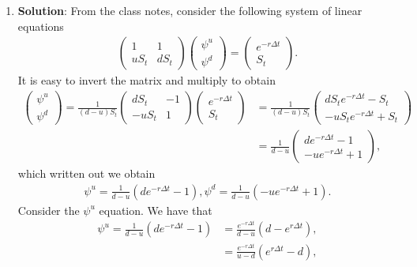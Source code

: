 \documentclass[10pt,english]{article}
\theoremstyle{plain}
\begin{document}
\begin{enumerate}
\item \textbf{Solution}: From the class notes, consider the following system of linear equations
\begin{align}
\left(
\begin{array}{cc}
1 & 1 \\
uS_{t} & dS_{t}
\end{array}\right)\left(\begin{array}{c}
\psi^{u}\\
\psi^{d}
\end{array}\right)=
\left(\begin{array}{c}
e^{-r\Delta t} \\
S_{t}
\end{array}\right).\label{leq}
\end{align}
It is easy to invert the matrix and multiply to obtain
\begin{align*}
\left(\begin{array}{c}
\psi^{u}\\
\psi^{d}
\end{array}\right)=\frac{1}{(d-u)S_{t}}\left(\begin{array}{cc}
dS_{t} & -1 \\
-uS_{t} & 1
\end{array}\right)
\left(\begin{array}{c}
e^{-r\Delta t} \\
S_{t}
\end{array}\right)&=\frac{1}{(d-u)S_{t}}\left(\begin{array}{c}
dS_{t}e^{-r\Delta t}-S_{t}\\
-uS_{t}e^{-r\Delta t} + S_{t}
\end{array}\right)\\
&=\frac{1}{d-u}\left(\begin{array}{c}
de^{-r\Delta t}-1\\
-ue^{-r\Delta t} +1
\end{array}\right),
\end{align*}
which written out we obtain
\begin{align}
\psi^{u} = \frac{1}{d-u}(de^{-r\Delta t} - 1), \psi^{d}=\frac{1}{d-u}(-ue^{-r\Delta t} + 1).
\end{align}
Consider the $\psi^{u}$ equation. We have that
\begin{align*}
\psi^{u} = \frac{1}{d-u}(de^{-r\Delta t} - 1) &= \frac{e^{-r\Delta t}}{d-u}(d - e^{r\Delta t}),\\
&= \frac{e^{-r\Delta t}}{u-d}(e^{r\Delta t}-d),\\

\end{align*}
\end{enumerate}
\end{document}
